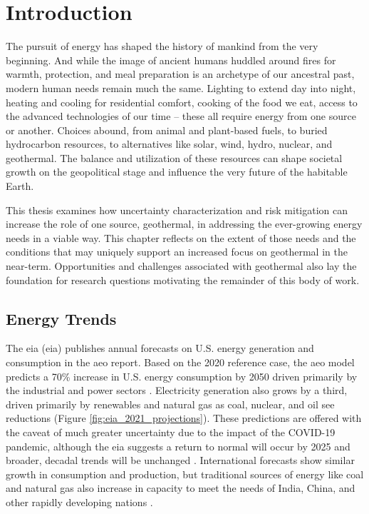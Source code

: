 \chapter{Introduction}\label{ch1:intro}
The pursuit of energy has shaped the history of mankind from the very beginning. And while the image of ancient humans huddled around fires for warmth, protection, and meal preparation is an archetype of our ancestral past, modern human needs remain much the same. Lighting to extend day into night, heating and cooling for residential comfort, cooking of the food we eat, access to the advanced technologies of our time – these all require energy from one source or another. Choices abound, from animal and plant-based fuels, to buried hydrocarbon resources, to alternatives like solar, wind, hydro, nuclear, and geothermal. The balance and utilization of these resources can shape societal growth on the geopolitical stage and influence the very future of the habitable Earth.

This thesis examines how uncertainty characterization and risk mitigation can increase the role of one source, geothermal, in addressing the ever-growing energy needs in a viable way. This chapter reflects on the extent of those needs and the conditions that may uniquely support an increased focus on geothermal in the near-term. Opportunities and challenges associated with geothermal also lay the foundation for research questions motivating the remainder of this body of work.

\section{Energy Trends}\label{ch1:trends}
The \acrlong{eia} (\acrshort{eia}) publishes annual forecasts on U.S. energy generation and consumption in the \acrlong{aeo} report. Based on the 2020 reference case, the \acrshort{aeo} model predicts a 70\% increase in U.S. energy consumption by 2050 driven primarily by the industrial and power sectors \citep{us_energy_information_administration_annual_2021}. Electricity generation also grows by a third, driven primarily by renewables and natural gas as coal, nuclear, and oil see reductions (Figure \ref{fig:eia_2021_projections}). These predictions are offered with the caveat of much greater uncertainty due to the impact of the COVID-19 pandemic, although the \acrshort{eia} suggests a return to normal will occur by 2025 and broader, decadal trends will be unchanged \citep{us_energy_information_administration_annual_2021}. International forecasts show similar growth in consumption and production, but traditional sources of energy like coal and natural gas also increase in capacity to meet the needs of India, China, and other rapidly developing nations \citep{us_energy_information_administration_international_2020}. 
 
